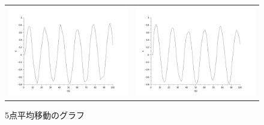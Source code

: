 \documentclass[a4paper,11pt]{jsarticle}
\begin{document}
\begin{figure}[H]
  \begin{tabular}{cc}
    \begin{minipage}[t]{0.48\textwidth}
      \centering
      \includegraphics[clip,width=9cm]{picture/kenkyu1.png}
      \caption{3点平均移動のグラフ}
      \label{G:tanjun3}
    \end{minipage} &
    \begin{minipage}[t]{0.48\textwidth}
      \centering
      \includegraphics[clip,width=9cm]{picture/kenkyu2.png}
      \caption{5点平均移動のグラフ}
      \label{G:tanjun5}
    \end{minipage}
  \end{tabular}
\end{figure}
\end{document}
